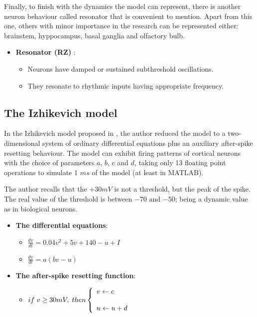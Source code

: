 \documentclass{article} %
\begin{document}
Finally, to finish with the dynamics the model can represent, there is another neuron behaviour called resonator that is convenient to mention. Apart from this one, others with minor importance in the research can be represented either: brainstem, hyppocampus, basal ganglia and olfactory bulb.

\begin{itemize}
    \item \textbf{Resonator (RZ) }:
     \begin{itemize}
        \item Neurons have damped or sustained subthreshold oscillations. 
        \item They resonate to rhythmic inputs having appropriate frequency.
    \end{itemize}
\end{itemize}

\subsection{The Izhikevich model}

In the Izhikevich model proposed in \cite{Izhikevich2003Simple}, the author reduced the model to a two-dimensional system of ordinary differential equations plus an auxiliary after-spike resetting behaviour. The model can exhibit firing patterns of cortical neurons with the choice of parameters \(a\), \(b\), \(c\) and \(d\), taking only 13 floating point operations to simulate 1 \(ms\) of the model (at least in MATLAB).

The author recalls that the \(+30mV\) is not a threshold, but the peak of the spike. The real value of the threshold is between \(-70\) and \(-50\); being a dynamic value as in biological neurons.

\begin{itemize}
    \item \textbf{The differential equations}:
            \begin{itemize}
                 \item \( \frac{dv}{dt} = 0.04v^2 + 5v + 140 - u + I \) 
                 \item \( \frac{dv}{dt} = a(bv - u) \)
            \end{itemize}
    \item \textbf{The after-spike resetting function}:
            \begin{itemize} 
            \item
            \(if \hspace{1 mm} v \geq 30mV,  \hspace{1 mm} then 
            \left \{ \begin{array}{lcc}
                      v \leftarrow c \\
                      \\ u \leftarrow u+d \\
                       \end{array}
             \right. \)
             \end{itemize}
\end{itemize}
\end{document}

